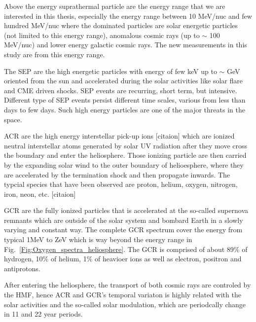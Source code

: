 Above the energy suprathermal particle are the energy range that we are interested in this thesis, especially the energy range between 10 MeV/nuc and few hundred MeV/nuc where the dominated particles are solar energetic particles (not limited to this energy range), anomalous cosmic rays (up to $\sim$ 100 MeV/nuc) and lower energy galactic cosmic rays. The new measurements in this study are from this energy range.

The \acl{SEP} are the high energetic particles with energy of few keV up to $\sim$ GeV oriented from the sun and accelerated during the solar activities like solar flare and \ac{CME} driven shocks. \acs{SEP} events are recurring, short term, but intensive. Different type of \acs{SEP} events persist different time scales, various from less than days to few days. Such high energy particles are one of the major threats in the space.

\acs{ACR} are the high energy interstellar pick-up ions [citaion] which are ionized neutral interstellar atoms generated by solar UV radiation after they move cross the boundary and enter the heliosphere. Those ionizing particle are then carried by the expanding solar wind to the outer boundary of helioesphere, where they are accelerated by the termination shock and then propagate inwards. The typcial species that have been observed are proton, helium, oxygen, nitrogen, iron, neon, etc. [citaion]

\ac{GCR} are the fully ionized particles that is accelerated at the so-called supernova remnants \cite{Blasi2013AARv2013} which are outside of the solar system and bombard Earth in a slowly varying and constant way. The complete GCR spectrum cover the energy from typical 1MeV \citet{Potgieter2013LRSP} to ZeV which is way beyond the energy range in Fig.~\ref{Fig:Oxygen_spectra_heliosphere}. The \acs{GCR} is comprised of about 89\% of hydrogen, 10\% of helium, 1\% of heavioer ions as well as electron, positron and antiprotons. 

After entering the heliosphere, the transport of both cosmic rays are controled by the \ac{HMF}, hence \ac{ACR} and \ac{GCR}'s temporal variaton is highly related with the solar activities and the so-called solar modulation, which are periodcally change in 11 and 22 year periods. 


